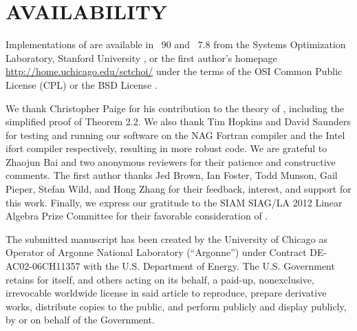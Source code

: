 \documentclass{doc_acmtrans2m}
\begin{document}
\section{AVAILABILITY}

Implementations of \MINRESQLP{} are available in \FORTRAN~90 and
\MATLAB~7.8 from the Systems Optimization Laboratory, Stanford
University \hbox{}, or the first author's homepage
\url{http://home.uchicago.edu/sctchoi/} under the terms of the OSI
Common Public License (CPL) \hbox{} or the BSD License
\hbox{}.



\begin{acks}
  We thank Christopher Paige for his contribution to the theory of
  \MINRESQLP, including the simplified proof of Theorem 2.2.  We also
  thank Tim Hopkins and David Saunders for testing and running our
  software on the NAG Fortran compiler and the Intel ifort compiler respectively,
  resulting in more robust code. We are grateful to Zhaojun Bai and
  two anonymous reviewers for their patience and constructive
  comments. The first author thanks Jed Brown, Ian Foster, Todd
  Munson, Gail Pieper, Stefan Wild, and Hong Zhang for their feedback,
  interest, and support for this work.  Finally,
  we express our gratitude to the SIAM SIAG/LA 2012 Linear Algebra
  Prize Committee for their favorable consideration of
  \MINRESQLP.
\end{acks}

 




\vfill
{\small The submitted manuscript has been created by the University of
  Chicago as Operator of Argonne National Laboratory (``Argonne'')
  under Contract DE-AC02-06CH11357 with the U.S. Department of Energy.
  The U.S. Government retains for itself, and others acting on its
  behalf, a paid-up, nonexclusive, irrevocable worldwide license in
  said article to reproduce, prepare derivative works, distribute
  copies to the public, and perform publicly and display publicly, by
  or on behalf of the Government.}
\end{document}
